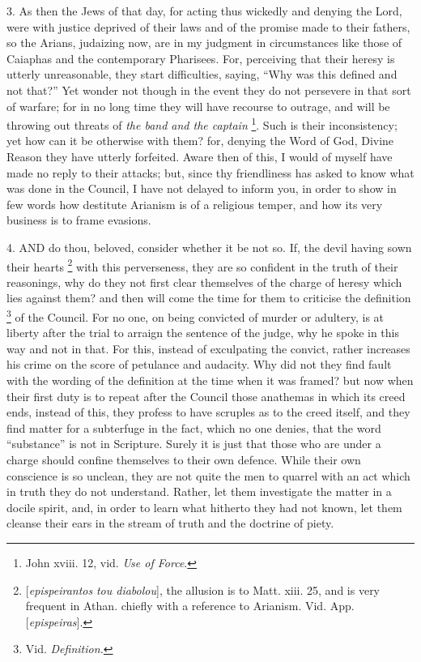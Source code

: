 3. As then the Jews of that
day, for acting thus wickedly and denying the Lord, were with justice
deprived of their laws and of the promise made to their fathers, so
the Arians, judaizing now, are in my judgment in circumstances like
those of Caiaphas and the contemporary Pharisees. For, perceiving that
their heresy is utterly unreasonable, they start difficulties, saying,
``Why was this defined and not that?'' Yet wonder not though in the
event they do not persevere in that sort of warfare; for in no long
time they will have recourse to outrage, and will be throwing out
threats of \emph{the band and the captain} \footnote{John xviii. 12, vid. \emph{Use of Force}.}. Such is their inconsistency; yet how can it be otherwise with
them? for, denying the Word of God, Divine Reason they have utterly
forfeited. Aware then of this, I would of myself have made no reply to
their attacks; but, since thy friendliness has asked to know what was
done in the Council, I have not delayed to inform you, in order to
show in few words how destitute Arianism is of a religious temper, and
how its very business is to frame evasions.


4. AND
do thou, beloved, consider whether it be not so. If, the devil having
sown their hearts \footnote{[\emph{epispeirantos} \emph{tou diabolou}], the allusion is to Matt.
xiii. 25, and is very frequent in Athan. chiefly with a reference to
Arianism. Vid. App. [\emph{epispeiras}].} with
this perverseness, they are so confident in the truth of their
reasonings, why do they not first clear themselves of the charge of
heresy which lies against them? and then will come the time for them
to criticise the definition \footnote{Vid. \emph{Definition.}}
of the Council. For no one, on being convicted of murder or adultery,
is at liberty after the trial to arraign the sentence of the judge,
why he spoke in this way and not in that. For this, instead of
exculpating the convict, rather increases his crime on the score of
petulance and audacity. Why did not they find fault with the wording
of the definition at the time when it was framed? but now when their
first duty is to repeat after the Council those anathemas in which its
creed ends, instead of this, they profess to have scruples as to the
creed itself, and they find matter for a subterfuge in the fact, which
no one denies, that the word ``substance'' is not in Scripture. Surely
it is just that those who are under a charge should confine themselves
to their own defence. While their own conscience is so unclean, they
are not quite the men to quarrel with an act which in truth they do
not understand. Rather, let them investigate the matter in a docile
spirit, and, in order to learn what hitherto they had not known, let
them cleanse their ears in the stream of truth and the doctrine of
piety.

